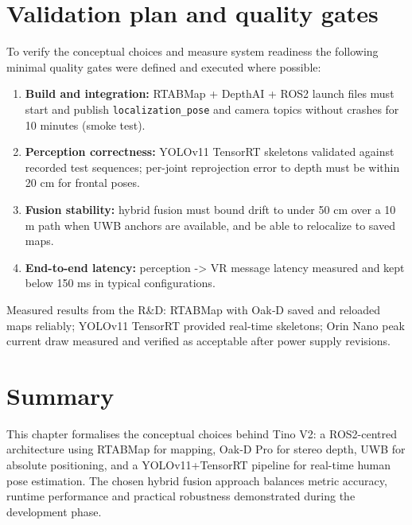 \section{Validation plan and quality gates}

To verify the conceptual choices and measure system readiness the following minimal quality gates were defined and executed where possible:

\begin{enumerate}
	\item \textbf{Build and integration:} RTABMap + DepthAI + ROS2 launch files must start and publish \texttt{localization\_pose} and camera topics without crashes for 10 minutes (smoke test).
	\item \textbf{Perception correctness:} YOLOv11 TensorRT skeletons validated against recorded test sequences; per-joint reprojection error to depth must be within 20 cm for frontal poses.
	\item \textbf{Fusion stability:} hybrid fusion must bound drift to under 50 cm over a 10 m path when UWB anchors are available, and be able to relocalize to saved maps.
	\item \textbf{End-to-end latency:} perception -> VR message latency measured and kept below 150 ms in typical configurations.
\end{enumerate}

Measured results from the R\&D: RTABMap with Oak‑D saved and reloaded maps reliably; YOLOv11 TensorRT provided real-time skeletons; Orin Nano peak current draw measured and verified as acceptable after power supply revisions.

\section{Summary}

This chapter formalises the conceptual choices behind Tino V2: a ROS2-centred architecture using RTABMap for mapping, Oak‑D Pro for stereo depth, UWB for absolute positioning, and a YOLOv11+TensorRT pipeline for real-time human pose estimation. The chosen hybrid fusion approach balances metric accuracy, runtime performance and practical robustness demonstrated during the development phase.

